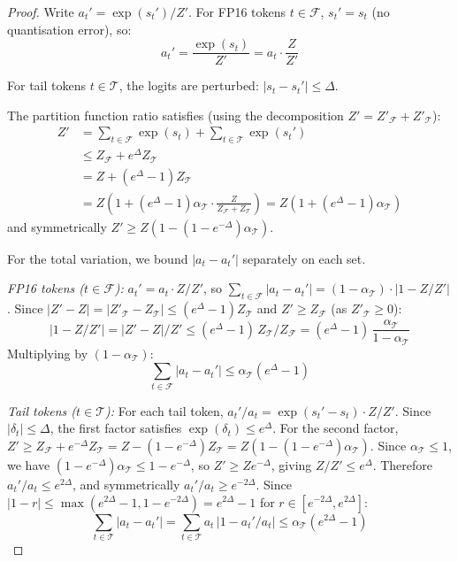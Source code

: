 \documentclass[11pt,a4paper]{article}
\theoremstyle{definition}
\theoremstyle{remark}
\begin{document}
\begin{proof}
Write $a_t' = \exp(s_t')/Z'$.  For FP16 tokens $t \in \mathcal{F}$, $s_t' = s_t$ (no quantisation error), so:
\[
  a_t' = \frac{\exp(s_t)}{Z'} = a_t \cdot \frac{Z}{Z'}
\]

For tail tokens $t \in \mathcal{T}$, the logits are perturbed: $|s_t - s_t'| \leq \Delta$.

The partition function ratio satisfies (using the decomposition $Z' = Z'_{\mathcal{F}} + Z'_{\mathcal{T}}$):
\begin{align*}
  Z' &= \sum_{t \in \mathcal{F}} \exp(s_t) + \sum_{t \in \mathcal{T}} \exp(s_t') \\
     &\leq Z_{\mathcal{F}} + e^{\Delta} Z_{\mathcal{T}} \\
     &= Z + (e^{\Delta} - 1) Z_{\mathcal{T}} \\
     &= Z \left(1 + (e^{\Delta} - 1) \alpha_{\mathcal{T}} \cdot \frac{Z}{Z_{\mathcal{F}} + Z_{\mathcal{T}}}\right) = Z(1 + (e^{\Delta}-1)\alpha_{\mathcal{T}})
\end{align*}
and symmetrically $Z' \geq Z(1 - (1 - e^{-\Delta})\alpha_{\mathcal{T}})$.

For the total variation, we bound $|a_t - a_t'|$ separately on each set.

\emph{FP16 tokens ($t \in \mathcal{F}$):}  $a_t' = a_t \cdot Z/Z'$, so $\sum_{t \in \mathcal{F}} |a_t - a_t'| = (1 - \alpha_{\mathcal{T}}) \cdot |1 - Z/Z'|$.
Since $|Z' - Z| = |Z'_{\mathcal{T}} - Z_{\mathcal{T}}| \leq (e^{\Delta} - 1)Z_{\mathcal{T}}$ and $Z' \geq Z_{\mathcal{F}}$ (as $Z'_{\mathcal{T}} \geq 0$):
\[
  |1 - Z/Z'| = |Z' - Z|/Z' \leq (e^{\Delta} - 1)\,Z_{\mathcal{T}} / Z_{\mathcal{F}}
  = (e^{\Delta} - 1)\,\frac{\alpha_{\mathcal{T}}}{1 - \alpha_{\mathcal{T}}}
\]
Multiplying by $(1 - \alpha_{\mathcal{T}})$:
\begin{equation}\label{eq:fp16_contrib}
  \sum_{t \in \mathcal{F}} |a_t - a_t'| \leq \alpha_{\mathcal{T}} (e^{\Delta} - 1)
\end{equation}

\emph{Tail tokens ($t \in \mathcal{T}$):}  For each tail token, $a_t'/a_t = \exp(s_t' - s_t) \cdot Z/Z'$.
Since $|\delta_t| \leq \Delta$, the first factor satisfies $\exp(\delta_t) \leq e^{\Delta}$.
For the second factor, $Z' \geq Z_{\mathcal{F}} + e^{-\Delta}Z_{\mathcal{T}} = Z - (1 - e^{-\Delta})Z_{\mathcal{T}} = Z(1 - (1 - e^{-\Delta})\alpha_{\mathcal{T}})$.
Since $\alpha_{\mathcal{T}} \leq 1$, we have $(1 - e^{-\Delta})\alpha_{\mathcal{T}} \leq 1 - e^{-\Delta}$, so $Z' \geq Z e^{-\Delta}$, giving $Z/Z' \leq e^{\Delta}$.
Therefore $a_t'/a_t \leq e^{2\Delta}$, and symmetrically $a_t'/a_t \geq e^{-2\Delta}$.
Since $|1 - r| \leq \max(e^{2\Delta} - 1, 1 - e^{-2\Delta}) = e^{2\Delta} - 1$ for $r \in [e^{-2\Delta}, e^{2\Delta}]$:
\begin{equation}\label{eq:tail_contrib}
  \sum_{t \in \mathcal{T}} |a_t - a_t'| = \sum_{t \in \mathcal{T}} a_t \,|1 - a_t'/a_t|
  \leq \alpha_{\mathcal{T}} (e^{2\Delta} - 1)
\end{equation}


\end{proof}
\end{document}
